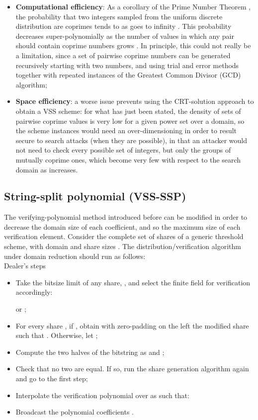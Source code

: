 \documentclass[10pt,journal,cspaper,compsoc]{IEEEtran}
\begin{document}
\begin{itemize}
\item \textbf{Computational efficiency}: As a corollary of the Prime Number Theorem
\cite{books/daglib/0001130}, the probability that two integers sampled from the uniform discrete distribution  are coprimes tends to  as  goes to infinity \cite{books/daglib/0083722}. This probability decreases super-polynomially as the number of values in which any pair should contain coprime numbers grows \cite{toth2002probability}. In principle, this could not really be a limitation, since a set of pairwise coprime numbers can be generated recursively starting with two numbers, and using trial and error methods together with repeated instances of the Greatest Common Divisor (GCD) algorithm;
\item \textbf{Space efficiency}: a worse issue prevents using the CRT-solution approach to obtain a VSS scheme: for what has just been stated, the density of sets of  pairwise coprime values is very low for a given power set  over a domain, so the scheme instances would need an over-dimensioning in order to result secure to search attacks (when they are possible), in that an attacker would not need to check every possible set of integers, but only the groups of mutually coprime ones, which become very few with respect to the search domain as  increases.
\end{itemize}

\subsection{String-split polynomial (VSS-SSP)}
The verifying-polynomial method introduced before can be modified in order to decrease the domain size of each coefficient, and so the maximum size of each verification element. Consider the complete set of shares  of a generic threshold scheme, with domain  and share sizes .
The distribution/verification algorithm under domain reduction should run as follows:\\

Dealer's steps

\begin{itemize}
\item Take the bitsize limit of any share, ,
and select the finite field for verification accordingly:

or 
;
\item For every share , if , obtain with zero-padding on the left the modified share  such that . Otherwise, let ;
\item Compute the two halves of the bitstring  as  and ;
\item Check that no two  are equal. If so, run the share generation algorithm again and go to the first step;
\item Interpolate the verification polynomial over  as  such that:

\item Broadcast the polynomial coefficients .
\end{itemize}
\end{document}

